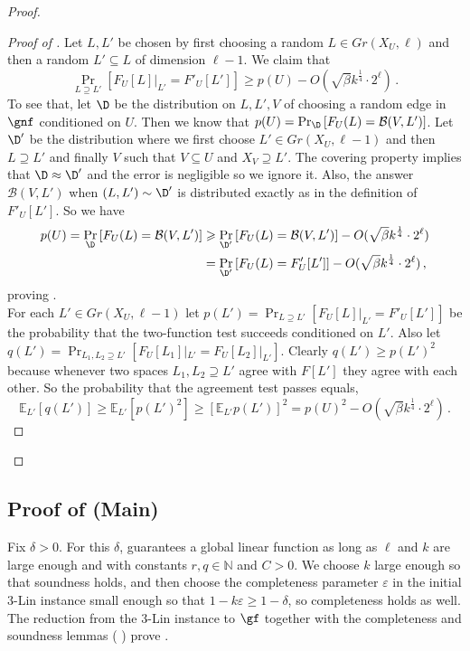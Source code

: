 \documentclass{toc}
\newcommand\E{\mathbb{E}}
\newcommand\Prob[2]{{\Pr_{#1}\left[ {#2} \right]}}
\newcommand\eps{\varepsilon}
\renewcommand\geq{\geqslant}
\renewcommand\ge{\geqslant}
\renewcommand\subset{\subseteq}
\renewcommand\supset{\supseteq}
\def\B{\mathcal{B}}
\begin{document}
\begin{proof}
\begin{proof}[Proof of ]
Let $L,L'$ be chosen by first choosing a random $L\in Gr(X_U,\ell)$ and then a random $L'\subset L$ of dimension $\ell-1$.
We claim that
\begin{equation}\label{eq1} \Prob{L\supset L'}{F_U[L]|_{L'} = F'_U[L'] }\ge p(U)- O(\sqrt{\beta} k^{\frac{1}{4}} \cdot 2^{\ell})\,.
\end{equation}
To see that, let $\D$ be the distribution on $L,L',V$ of choosing a random edge in $\gnf$ conditioned on $U$. Then we know that $p(U) = \Prob{\D}{F_U(L) = \B(V,L')}$.
Let $\D'$ be the distribution where we first choose $L' \in Gr(X_U,\ell-1)$ and then $L\supset L'$ and finally $V$ such that $V\subset U$ and $X_V \supset L'$. The covering property implies that $\D\approx \D'$ and the error is negligible so we ignore it. Also, the answer $\B(V,L')$ when $(L,L')\sim \D'$ is distributed exactly as in the definition of $F'_U[L']$. So we have
\begin{align*}
p(U) = \Prob{\D}{F_U(L) = \B(V,L')}
&\geq \Prob{\D'}{F_U(L) = \B(V,L')} -  O(\sqrt{\beta} k^{\frac{1}{4}} \cdot 2^{\ell})\\
&= \Prob{\D'}{F_U(L) = F_U'[L']} -  O(\sqrt{\beta} k^{\frac{1}{4}} \cdot 2^{\ell})\,,
\end{align*}
proving .\\

For each $L'\in Gr(X_U,\ell-1)$ let $p(L') = \Prob{L\supset L'}{F_U[L]|_{L'} = F'_U[L']}$ be the probability that the two-function test succeeds conditioned on $L'$. Also let $q(L') = \Prob{L_1,L_2\supset L'}{F_U[L_1]|_{L'} = F_U[L_2]|_{L'}}$. %
Clearly $q(L') \ge p(L')^2$ because whenever two spaces $L_1,L_2\supset L'$ agree with $F[L']$ they agree with each other.
So the probability that the agreement test passes equals,
\[ \E_{L'} [q(L')] \ge \E_{L'} [ p(L')^2] \ge [ \E_{L'} p(L') ] ^2 = p(U)^2- O(\sqrt{\beta} k^{\frac{1}{4}} \cdot 2^{\ell})\,.\]
\end{proof}
\end{proof}








\subsection{Proof of (Main) }

Fix $\delta>0$. For this $\delta$,  guarantees a global linear function as long as $\ell$ and $k$ are large enough and with constants $r,q\in \mathbb{N}$ and $C>0$. We choose $k$ large enough so that soundness holds, and then choose the completeness parameter $\eps$ in the initial 3-Lin instance small enough so that $1-k\eps \ge 1-\delta$, so completeness holds as well. The reduction from the 3-Lin instance to $\gf$ together with the completeness and soundness lemmas ( ) prove .
\end{document}
